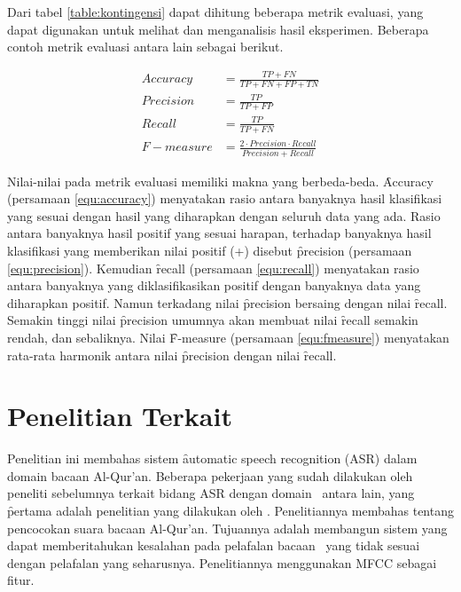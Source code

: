 Dari tabel \ref{table:kontingensi} dapat dihitung beberapa metrik evaluasi, yang dapat digunakan untuk melihat dan menganalisis hasil eksperimen. Beberapa contoh metrik evaluasi antara lain sebagai berikut.

\begin{align}
  Accuracy &= \frac{TP+FN}{TP+FN+FP+TN} \label{equ:accuracy} \\
  Precision &= \frac{TP}{TP+FP} \label{equ:precision} \\
  Recall &= \frac{TP}{TP+FN} \label{equ:recall} \\
  F-measure &= \frac{2 \cdot Precision \cdot Recall}{Precision + Recall} \label{equ:fmeasure}
\end{align}

Nilai-nilai pada metrik evaluasi memiliki makna yang berbeda-beda. \f{Accuracy} (persamaan \ref{equ:accuracy}) menyatakan rasio antara banyaknya hasil klasifikasi yang sesuai dengan hasil yang diharapkan dengan seluruh data yang ada. Rasio antara banyaknya hasil positif yang sesuai harapan, terhadap banyaknya hasil klasifikasi yang memberikan nilai positif (+) disebut \f{precision} (persamaan \ref{equ:precision}). Kemudian \f{recall} (persamaan \ref{equ:recall}) menyatakan rasio antara banyaknya yang diklasifikasikan positif dengan banyaknya data yang diharapkan positif. Namun terkadang nilai \f{precision} bersaing dengan nilai \f{recall}. Semakin tinggi nilai \f{precision} umumnya akan membuat nilai \f{recall} semakin rendah, dan sebaliknya. Nilai \f{F-measure} (persamaan \ref{equ:fmeasure}) menyatakan rata-rata harmonik antara nilai \f{precision} dengan nilai \f{recall}.



\section{Penelitian Terkait}
Penelitian ini membahas sistem \f{automatic speech recognition} (ASR) dalam domain bacaan Al-Qur'an. Beberapa pekerjaan yang sudah dilakukan oleh peneliti sebelumnya terkait bidang ASR dengan domain \quran~antara lain, yang \f{pertama} adalah penelitian yang dilakukan oleh \cite{Muhammad:2010:VCM:1934908.1935467}. Penelitiannya membahas tentang pencocokan suara bacaan Al-Qur'an. Tujuannya adalah membangun sistem yang dapat memberitahukan kesalahan pada pelafalan bacaan \quran~yang tidak sesuai dengan pelafalan yang seharusnya. Penelitiannya menggunakan MFCC sebagai fitur.%

